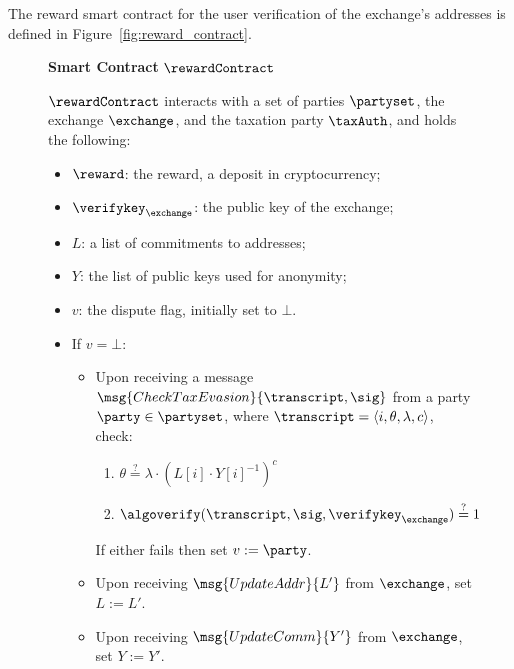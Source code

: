 The reward smart contract for the user verification of the exchange's addresses
is defined in Figure~\ref{fig:reward_contract}.

\begin{figure}[h]
\begin{mdframed}

\begin{center}
    \textbf{Smart Contract} $\rewardContract$
\end{center}

    $\rewardContract$ interacts with a set of parties $\partyset$, the exchange
    $\exchange$, and the taxation party $\taxAuth$, and holds the following:
    \begin{itemize}
        \item $\reward$: the reward, \ie a deposit in cryptocurrency;
        \item $\verifykey_\exchange$: the public key of the exchange;
        \item $L$: a list of commitments to addresses;
        \item $Y$: the list of public keys used for anonymity;
        \item $v$: the dispute flag, initially set to $\bot$.
    \end{itemize}

    \begin{itemize}
        \item If $v = \bot$:
            \begin{itemize}
                \item Upon receiving a message
                    $\msg{CheckTaxEvasion}{\transcript, \sig}$ from a party
                    $\party \in \partyset$, where $\transcript = \langle i,
                    \theta, \lambda, c \rangle$, check:
                    \begin{enumerate}
                        \item $\theta \stackrel{?}{=} \lambda \cdot (L[i] \cdot Y[i]^{-1})^c$
                        \item $\algoverify(\transcript, \sig, \verifykey_\exchange) \stackrel{?}{=} 1$
                    \end{enumerate}
                    If either fails then set $v := \party$.
                \item Upon receiving $\msg{UpdateAddr}{L'}$ from $\exchange$,
                    set $L := L'$.
                \item Upon receiving $\msg{UpdateComm}{Y'}$ from $\exchange$,
                    set $Y := Y'$.
            \end{itemize}


\end{itemize}
\end{mdframed}
\end{figure}
